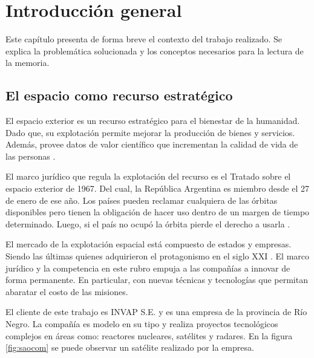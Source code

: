 \chapter{Introducción general}
\label{ch:introduccion}

Este capítulo presenta de forma breve el contexto del trabajo realizado.
Se explica la problemática solucionada y los conceptos necesarios para la lectura de la memoria.

\newcommand{\keyword}[1]{\textbf{#1}}
\newcommand{\tabhead}[1]{\textbf{#1}}
\newcommand{\code}[1]{\texttt{#1}}
\newcommand{\file}[1]{\texttt{\bfseries#1}}
\newcommand{\option}[1]{\texttt{\itshape#1}}
\newcommand{\grados}{$^{\circ}$}

\section{El espacio como recurso estratégico}
\label{sec:1space}

El espacio exterior es un recurso estratégico para el bienestar de la humanidad.
Dado que, su explotación permite mejorar la producción de bienes y servicios.
Además, provee datos de valor científico que incrementan la calidad de vida de las personas \citep{BOOK:spaceage}.

El marco jurídico que regula la explotación del recurso es el Tratado sobre el espacio exterior de 1967.
Del cual, la República Argentina es miembro desde el 27 de enero de ese año.
Los países pueden reclamar cualquiera de las órbitas disponibles pero tienen la obligación de hacer uso dentro de un margen de tiempo determinado.
Luego, si el país no ocupó la órbita pierde el derecho a usarla \citep{BOOK:resurrect}.

El mercado de la explotación espacial está compuesto de estados y empresas.
Siendo las últimas quienes adquirieron el protagonismo en el siglo XXI \citep{ARTICLE:transition}.
El marco jurídico y la competencia en este rubro empuja a las compañías a innovar de forma permanente.
En particular, con nuevas técnicas y tecnologías que permitan abaratar el costo de las misiones.

El cliente de este trabajo es INVAP S.E. y es una empresa de la provincia de Río Negro.
La compañía es modelo en su tipo y realiza proyectos tecnológicos complejos en áreas como: reactores nucleares, satélites y radares.
En la figura \ref{fig:saocom} se puede observar un satélite realizado por la empresa.

\newpage


